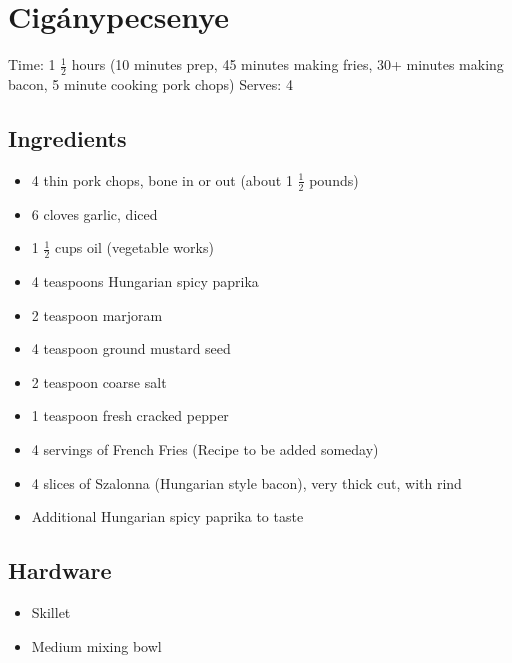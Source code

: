 \section{Cigánypecsenye}
\label{ciganypecsenye}
Time: 1 \( \frac{1}{2} \) hours (10 minutes prep, 45 minutes making fries, 30+ minutes making bacon, 5 minute cooking pork chops)
Serves: 4

\begin{multicols}{2}
\subsection*{Ingredients}
\begin{itemize}
    \item 4 thin pork chops, bone in or out (about 1 \( \frac{1}{2} \) pounds)
    \item 6 cloves garlic, diced
    \item 1 \( \frac{1}{2} \) cups oil (vegetable works)
    \item 4 teaspoons Hungarian spicy paprika
    \item 2 teaspoon marjoram
    \item 4 teaspoon ground mustard seed
    \item 2 teaspoon coarse salt
    \item 1 teaspoon fresh cracked pepper
    \item 4 servings of French Fries (Recipe to be added someday)
    \item 4 slices of Szalonna (Hungarian style bacon), very thick cut, with rind
    \item Additional Hungarian spicy paprika to taste
\end{itemize}

\subsection*{Hardware}
\begin{itemize}
    \item Skillet
    \item Medium mixing bowl
\end{itemize}
\clearpage


\end{multicols}
